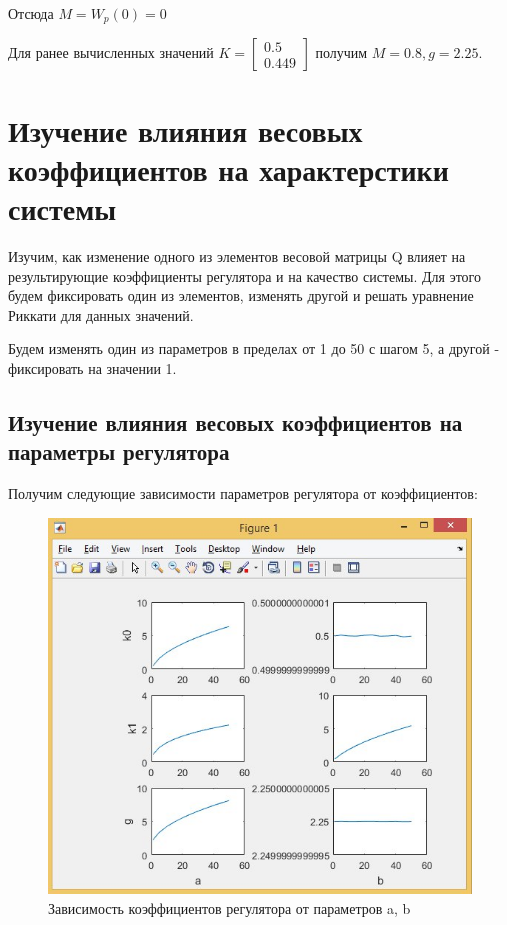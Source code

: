 \documentclass[14pt,a4paper,report]{report}
\begin{document}
Отсюда $M=W_p(0)=0$

Для ранее вычисленных значений $K=\begin{bmatrix} 0.5 \\ 0.449 \end{bmatrix}$ получим $M=0.8,g=2.25$.

\newpage

\section{Изучение влияния весовых коэффициентов на характерстики системы}

Изучим, как изменение одного из элементов весовой матрицы Q влияет на результирующие коэффициенты регулятора и на качество системы. Для этого будем фиксировать один из элементов, изменять другой и решать уравнение Риккати для данных значений.

Будем изменять один из параметров в пределах от 1 до 50 с шагом 5, а другой - фиксировать на значении 1.

\subsection{Изучение влияния весовых коэффициентов на параметры регулятора}

Получим следующие зависимости параметров регулятора от коэффициентов:

\begin{figure}[h!]
	\centering
	\includegraphics[scale = 0.55]{images/regq.png}
	\caption{Зависимость коэффициентов регулятора от параметров a, b}
	\label{image:3}
\end{figure}
\FloatBarrier
\end{document}
